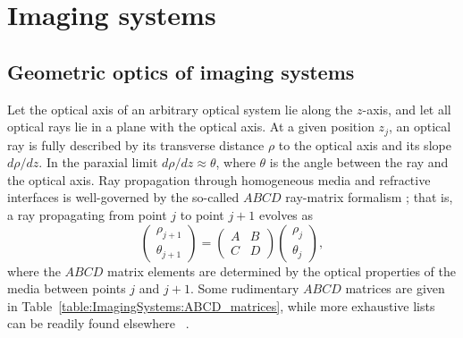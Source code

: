 \chapter{Imaging systems}
\label{app:ImagingSystems}


\section{Geometric optics of imaging systems}
Let the optical axis of an arbitrary optical system lie along the $z$-axis,
and let all optical rays lie in a plane with the optical axis.
At a given position $z_j$, an optical ray is fully described by
its transverse distance $\rho$ to the optical axis and
its slope $d\rho / dz$.
In the paraxial limit $d\rho / dz \approx \theta$,
where $\theta$ is the angle between the ray and the optical axis.
Ray propagation through homogeneous media and refractive interfaces
is well-governed by the so-called $ABCD$ ray-matrix formalism
\cite[Ch.~15]{siegman_lasers};
that is, a ray propagating from point $j$ to point $j + 1$ evolves as
\begin{equation}
  \begin{pmatrix}
    \rho_{j + 1}
    \\
    \theta_{j + 1}
  \end{pmatrix}
  =
  \begin{pmatrix}
    A & B
    \\
    C & D
  \end{pmatrix}
  \begin{pmatrix}
    \rho_j
    \\
    \theta_j
  \end{pmatrix},
  \label{eq:ImagingSystems:ABCD_ray_tracing_general}
\end{equation}
where the $ABCD$ matrix elements are determined
by the optical properties of the media between points $j$ and $j + 1$.
Some rudimentary $ABCD$ matrices are given in
Table~\ref{table:ImagingSystems:ABCD_matrices}, while
more exhaustive lists can be readily found elsewhere
\cite[Ch.~15]{siegman_lasers}~\cite{tovar_generalized_beam_matrices_IV}.

